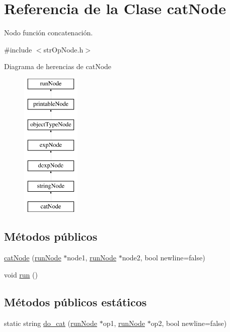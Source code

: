 \hypertarget{classcatNode}{\section{Referencia de la Clase cat\-Node}
\label{classcatNode}
}


Nodo función concatenación.  




{\ttfamily \#include $<$str\-Op\-Node.\-h$>$}

Diagrama de herencias de cat\-Node\begin{figure}[H]
\begin{center}
\leavevmode
\includegraphics[height=7.000000cm]{classcatNode}
\end{center}
\end{figure}
\subsection*{Métodos públicos}
\begin{DoxyCompactItemize}
\item 
\hyperlink{classcatNode_a1ea19392b499f9383534fd26ccc9a6c8}{cat\-Node} (\hyperlink{classrunNode}{run\-Node} $\ast$node1, \hyperlink{classrunNode}{run\-Node} $\ast$node2, bool newline=false)
\item 
void \hyperlink{classcatNode_af6735016b3cb2477a94de79d7e1e1c62}{run} ()
\end{DoxyCompactItemize}
\subsection*{Métodos públicos estáticos}
\begin{DoxyCompactItemize}
\item 
static string \hyperlink{classcatNode_ae861e45f75270c8ba63e9bffd6bb7806}{do\-\_\-cat} (\hyperlink{classrunNode}{run\-Node} $\ast$op1, \hyperlink{classrunNode}{run\-Node} $\ast$op2, bool newline=false)
\end{DoxyCompactItemize}
